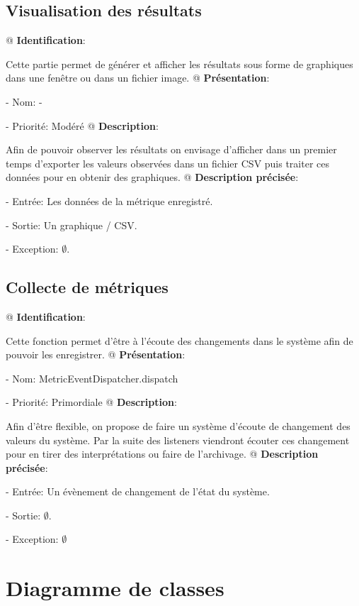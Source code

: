 \documentclass[final]{polytech/polytech}
\begin{document}
	\section{Visualisation des résultats}
		\begin{easylist}[enumerate]
			@ \textbf{Identification}:
			
			Cette partie permet de générer et afficher les résultats sous forme de graphiques dans une fenêtre ou dans un fichier image.
			@ \textbf{Présentation}:
			
			- Nom: -
			
			- Priorité: Modéré
			@ \textbf{Description}:
			
			Afin de pouvoir observer les résultats on envisage d'afficher dans un premier temps d'exporter les valeurs observées dans un fichier CSV puis traiter ces données pour en obtenir des graphiques.
			@ \textbf{Description précisée}:
			
			- Entrée: Les données de la métrique enregistré.
			
			- Sortie: Un graphique / CSV.
			
			- Exception: $\emptyset$.
		\end{easylist}
		
	\section{Collecte de métriques}
		\begin{easylist}[enumerate]
			@ \textbf{Identification}:
			
			Cette fonction permet d'être à l'écoute des changements dans le système afin de pouvoir les enregistrer.
			@ \textbf{Présentation}:
			
			- Nom: MetricEventDispatcher.dispatch
			
			- Priorité: Primordiale
			@ \textbf{Description}:
			
			Afin d'être flexible, on propose de faire un système d'écoute de changement des valeurs du système.
			Par la suite des listeners viendront écouter ces changement pour en tirer des interprétations ou faire de l'archivage.
			@ \textbf{Description précisée}:
			
			- Entrée: Un évènement de changement de l'état du système.
			
			- Sortie: $\emptyset$.
			
			- Exception: $\emptyset$
		\end{easylist}
	
\chapter{Diagramme de classes}
	\vspace{-50pt}
			
\end{document}
